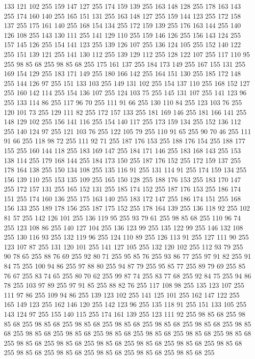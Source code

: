 133 121 102 255 159 147 127 255 174 159 139 255 163 148 128 255 178 163 143 255 174 160 140 255 165 151 131 255 163 148 127 255 159 144 123 255 172 158 137 255 175 161 140 255 168 154 134 255 172 159 139 255 176 163 144 255 140 126 108 255 143 130 111 255 141 129 110 255 159 146 126 255 156 143 124 255 157 145 126 255 154 141 123 255 139 126 107 255 136 124 105 255 152 140 122 255 151 139 121 255 141 130 112 255 139 129 112 255 128 122 107 255 117 110 95 255 98 85 68 255 98 85 68 255 175 161 137 255 184 173 149 255 167 155 131 255 169 154 129 255 183 171 149 255 180 166 142 255 164 151 130 255 185 172 148 255 144 126 97 255 151 133 103 255 149 131 102 255 154 137 110 255 168 152 127 255 160 142 114 255 154 136 107 255 124 103 75 255 145 131 107 255 141 123 96 255 133 114 86 255 117 96 70 255 111 91 66 255 130 110 84 255 123 103 76 255 120 101 73 255 129 111 82 255 172 157 133 255 181 169 146 255 181 166 141 255 148 129 102 255 156 141 116 255 154 140 117 255 173 159 134 255 152 136 112 255
140 124 97 255 121 103 76 255 122 105 79 255 110 91 65 255 90 70 46 255 111 91 66 255 118 98 72 255 111 92 71 255 187 176 153 255 188 176 154 255 188 177 155 255 160 144 118 255 183 169 147 255 184 171 146 255 183 168 143 255 153 138 114 255 179 168 144 255 184 173 150 255 187 176 152 255 172 159 137 255 178 164 138 255 150 134 108 255 135 116 91 255 131 114 91 255 174 159 134 255 156 139 110 255 153 135 109 255 165 150 128 255 188 176 153 255 183 170 147 255 172 157 131 255 165 152 131 255 185 174 152 255 187 176 153 255 186 174 151 255 174 160 136 255 175 163 140 255 183 172 147 255 186 174 151 255 168 156 133 255 189 178 156 255 187 175 152 255 178 164 139 255 136 118 92 255 102 81 57 255 142 126 101 255 136 119 95 255 93 79 61 255 98 85 68 255 110 96 74 255 123 108 86 255 140 127 104 255 136 123 99 255 135 122 99 255 146 132 108 255 130 116 93 255 132 119 96 255 124 110 89 255 126 113 91 255 127 111 90 255 123 107 87 255 131 120 101 255 141 127 105 255 132 120 102 255
112 93 79 255 90 78 65 255 88 76 69 255 92 80 71 255 95 85 76 255 93 86 77 255 97 91 82 255 91 84 75 255 100 94 86 255 97 88 80 255 94 87 79 255 95 85 77 255 89 79 69 255 85 76 67 255 83 74 65 255 80 70 62 255 99 87 74 255 83 77 68 255 92 84 75 255 94 86 78 255 103 97 89 255 97 91 85 255 88 82 76 255 117 108 98 255 135 123 107 255 111 97 86 255 109 94 86 255 139 123 102 255 141 125 101 255 162 147 122 255 165 149 123 255 162 146 120 255 142 123 96 255 135 118 91 255 151 133 105 255 143 124 97 255 155 140 115 255 174 161 139 255 123 111 92 255 98 85 68 255 98 85 68 255 98 85 68 255 98 85 68 255 98 85 68 255 98 85 68 255 98 85 68 255 98 85 68 255 98 85 68 255 98 85 68 255 98 85 68 255 98 85 68 255 98 85 68 255 98 85 68 255 98 85 68 255 98 85 68 255 98 85 68 255 98 85 68 255 98 85 68 255 98 85 68 255 98 85 68 255 98 85 68 255 98 85 68 255 98 85 68 255 98 85 68 255
